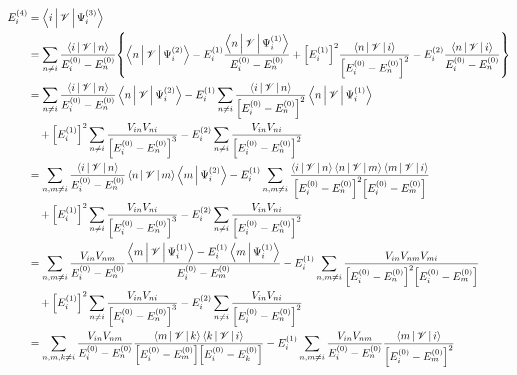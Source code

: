 \documentclass[a4paper]{article}
\numberwithin{equation}{subsection}
\begin{document}
\begin{align}
E_i^{(4)} &= \Braket{i | \mathscr{V} | \Psi_i^{(3)}} \notag\\
&= \sum_{n\neq i} \dfrac{\Braket{i | \mathscr{V} | n}}{E_i^{(0)} - E_n^{(0)}} \qty{\Braket{n | \mathscr{V} | \Psi_i^{(2)}} 
- E_i^{(1)} \dfrac{\Braket{n | \mathscr{V} | \Psi_i^{(1)}}}{E_i^{(0)} - E_n^{(0)}} 
+ \qty[E_i^{(1)}]^2 \dfrac{\Braket{n|\mathscr{V}|i}}{\qty[E_i^{(0)} - E_n^{(0)}]^2} 
- E_i^{(2)} \dfrac{\Braket{n|\mathscr{V}|i}}{E_i^{(0)} - E_n^{(0)}} }\notag\\
&= \sum_{n\neq i} \dfrac{\Braket{i | \mathscr{V} | n}}{E_i^{(0)} - E_n^{(0)}} \Braket{n | \mathscr{V} | \Psi_i^{(2)}} 
- E_i^{(1)} \sum_{n\neq i} \dfrac{\Braket{i | \mathscr{V} | n}}{\qty[E_i^{(0)} - E_n^{(0)}]^2} \Braket{n | \mathscr{V} | \Psi_i^{(1)}} \notag\\
&{}\quad +  \qty[E_i^{(1)}]^2 \sum_{n\neq i} \dfrac{V_{in}V_{ni}}{\qty[E_i^{(0)} - E_n^{(0)}]^3} 
-  E_i^{(2)} \sum_{n\neq i} \dfrac{V_{in}V_{ni}}{\qty[E_i^{(0)} - E_n^{(0)}]^2} \notag\\
&= \sum_{n,m\neq i} \dfrac{\Braket{i | \mathscr{V} | n}}{E_i^{(0)} - E_n^{(0)}} \Braket{n | \mathscr{V} | m} \Braket{m |\Psi_i^{(2)}} 
- E_i^{(1)} \sum_{n,m\neq i} \dfrac{\Braket{i | \mathscr{V} | n}\Braket{n | \mathscr{V} | m}\Braket{m | \mathscr{V} | i} }{\qty[E_i^{(0)} - E_n^{(0)}]^2\qty[E_i^{(0)} - E_m^{(0)}]}  \notag\\
&{}\quad +  \qty[E_i^{(1)}]^2 \sum_{n\neq i} \dfrac{V_{in}V_{ni}}{\qty[E_i^{(0)} - E_n^{(0)}]^3} 
-  E_i^{(2)} \sum_{n\neq i} \dfrac{V_{in}V_{ni}}{\qty[E_i^{(0)} - E_n^{(0)}]^2} \notag\\
&= \sum_{n,m\neq i} \dfrac{V_{in} V_{nm}}{E_i^{(0)} - E_n^{(0)}} \dfrac{\Braket{m | \mathscr{V} | \Psi_i^{(1)}} - E_i^{(1)}\Braket{m|\Psi_i^{(1)}}}{E_i^{(0)} - E_m^{(0)}} 
- E_i^{(1)} \sum_{n,m\neq i} \dfrac{V_{in}V_{nm}V_{mi} }{\qty[E_i^{(0)} - E_n^{(0)}]^2\qty[E_i^{(0)} - E_m^{(0)}]}  \notag\\
&{}\quad +  \qty[E_i^{(1)}]^2 \sum_{n\neq i} \dfrac{V_{in}V_{ni}}{\qty[E_i^{(0)} - E_n^{(0)}]^3} 
-  E_i^{(2)} \sum_{n\neq i} \dfrac{V_{in}V_{ni}}{\qty[E_i^{(0)} - E_n^{(0)}]^2} \notag\\
&= \sum_{n,m,k\neq i} \dfrac{V_{in} V_{nm}}{E_i^{(0)} - E_n^{(0)}} \dfrac{\Braket{m | \mathscr{V} | k} \Braket{k| \mathscr{V} | i} }{\qty[E_i^{(0)} - E_m^{(0)}]\qty[E_i^{(0)} - E_k^{(0)}]} 
- E_i^{(1)}\sum_{n,m\neq i} \dfrac{V_{in} V_{nm}}{E_i^{(0)} - E_n^{(0)}} \dfrac{ \Braket{m| \mathscr{V} |i}}{\qty[E_i^{(0)} - E_m^{(0)}]^2} \notag\\

\end{align}
\end{document}
